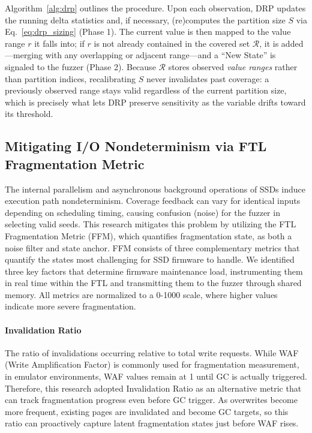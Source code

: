\documentclass[conference]{IEEEtran}
\begin{document}
Algorithm~\ref{alg:drp} outlines the procedure.
Upon each observation, DRP updates the running delta statistics and, if necessary, (re)computes the partition size $S$ via Eq.~\ref{eq:drp_sizing} (Phase 1).
The current value is then mapped to the value range $r$ it falls into; if $r$ is not already contained in the covered set $\mathcal{R}$, it is added---merging with any overlapping or adjacent range---and a ``New State'' is signaled to the fuzzer (Phase 2).
Because $\mathcal{R}$ stores observed \emph{value ranges} rather than partition indices, recalibrating $S$ never invalidates past coverage: a previously observed range stays valid regardless of the current partition size, which is precisely what lets DRP preserve sensitivity as the variable drifts toward its threshold.

\subsection{Mitigating I/O Nondeterminism via FTL Fragmentation Metric}
The internal parallelism and asynchronous background operations of SSDs induce execution path nondeterminism.
Coverage feedback can vary for identical inputs depending on scheduling timing, causing confusion (noise) for the fuzzer in selecting valid seeds.
This research mitigates this problem by utilizing the FTL Fragmentation Metric (FFM), which quantifies fragmentation state, as both a noise filter and state anchor.
FFM consists of three complementary metrics that quantify the states most challenging for SSD firmware to handle.
We identified three key factors that determine firmware maintenance load, instrumenting them in real time within the FTL and transmitting them to the fuzzer through shared memory.
All metrics are normalized to a 0-1000 scale, where higher values indicate more severe fragmentation.
 \paragraph{Invalidation Ratio}
The ratio of invalidations occurring relative to total write requests.
While WAF (Write Amplification Factor) is commonly used for fragmentation measurement, in emulator environments, WAF values remain at 1 until GC is actually triggered.
Therefore, this research adopted Invalidation Ratio as an alternative metric that can track fragmentation progress even before GC trigger.
As overwrites become more frequent, existing pages are invalidated and become GC targets, so this ratio can proactively capture latent fragmentation states just before WAF rises.
\end{document}
